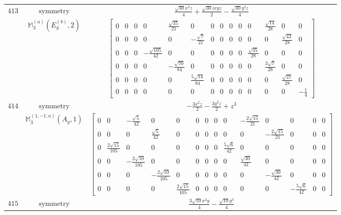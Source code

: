 \documentclass[fleqn,8pt,landscape]{jsarticle}
\begin{document}
\begin{longtable}{ccc}
$ 413 $ & $ \text{symmetry} $ & $ \frac{\sqrt{30} x^{2} z}{4} + \frac{\sqrt{30} i x y z}{2} - \frac{\sqrt{30} y^{2} z}{4} $ \\
$  $ & $ \mathbb{M}_{3}^{(a)}(E_{g}^{(b)},2) $ & $ \begin{bmatrix} 0 & 0 & 0 & 0 & \frac{\sqrt{35}}{21} & 0 & 0 & 0 & 0 & 0 & 0 & \frac{\sqrt{14}}{28} & 0 & 0 \\ 0 & 0 & 0 & 0 & 0 & - \frac{\sqrt{7}}{21} & 0 & 0 & 0 & 0 & 0 & 0 & \frac{\sqrt{42}}{28} & 0 \\ 0 & 0 & 0 & - \frac{\sqrt{105}}{42} & 0 & 0 & 0 & 0 & 0 & 0 & \frac{\sqrt{35}}{28} & 0 & 0 & 0 \\ 0 & 0 & 0 & 0 & - \frac{\sqrt{70}}{84} & 0 & 0 & 0 & 0 & 0 & 0 & \frac{3 \sqrt{7}}{28} & 0 & 0 \\ 0 & 0 & 0 & 0 & 0 & \frac{5 \sqrt{14}}{84} & 0 & 0 & 0 & 0 & 0 & 0 & \frac{\sqrt{21}}{28} & 0 \\ 0 & 0 & 0 & 0 & 0 & 0 & 0 & 0 & 0 & 0 & 0 & 0 & 0 & - \frac{1}{4} \end{bmatrix} $ \\ \hline
$ 414 $ & $ \text{symmetry} $ & $ - \frac{3 x^{2} z}{2} - \frac{3 y^{2} z}{2} + z^{3} $ \\
$  $ & $ \mathbb{M}_{3}^{(1,-1;a)}(A_{g},1) $ & $ \begin{bmatrix} 0 & 0 & - \frac{\sqrt{5}}{42} & 0 & 0 & 0 & 0 & 0 & 0 & - \frac{2 \sqrt{15}}{21} & 0 & 0 & 0 & 0 \\ 0 & 0 & 0 & \frac{\sqrt{5}}{42} & 0 & 0 & 0 & 0 & 0 & 0 & - \frac{2 \sqrt{15}}{21} & 0 & 0 & 0 \\ 0 & \frac{2 \sqrt{15}}{105} & 0 & 0 & 0 & 0 & 0 & 0 & \frac{5 \sqrt{6}}{42} & 0 & 0 & 0 & 0 & 0 \\ 0 & 0 & - \frac{2 \sqrt{10}}{105} & 0 & 0 & 0 & 0 & 0 & 0 & \frac{\sqrt{30}}{42} & 0 & 0 & 0 & 0 \\ 0 & 0 & 0 & - \frac{2 \sqrt{10}}{105} & 0 & 0 & 0 & 0 & 0 & 0 & - \frac{\sqrt{30}}{42} & 0 & 0 & 0 \\ 0 & 0 & 0 & 0 & \frac{2 \sqrt{15}}{105} & 0 & 0 & 0 & 0 & 0 & 0 & - \frac{5 \sqrt{6}}{42} & 0 & 0 \end{bmatrix} $ \\ \hline
$ 415 $ & $ \text{symmetry} $ & $ \frac{3 \sqrt{10} x^{2} y}{4} - \frac{\sqrt{10} y^{3}}{4} $ \\

\end{longtable}
\end{document}
